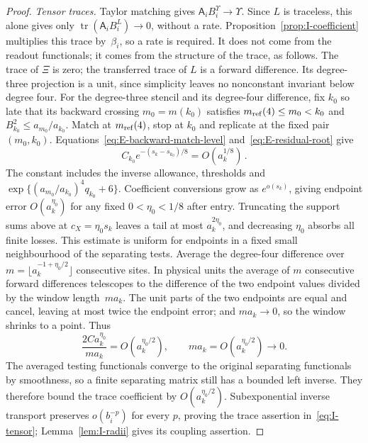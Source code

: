 \begin{proof}
\emph{Tensor traces.} Taylor matching gives $\mathsf A_iB_i^\Upsilon\to\Upsilon$. Since $L$ is traceless, this alone gives only $\operatorname{tr}(\mathsf A_iB_i^L)\to0$, without a rate. Proposition~\ref{prop:I-coefficient} multiplies this trace by~$\beta_i$, so a rate is required. It does not come from the readout functionals; it comes from the structure of the trace, as follows. The trace of $\Xi$ is zero; the transferred trace of $L$ is a forward difference. Its degree-three projection is a unit, since simplicity leaves no nonconstant invariant below degree four. For the degree-three stencil and its degree-four difference, fix $k_0$ so late that its backward crossing $m_0=m(k_0)$ satisfies $m_{\mathrm{ref}}(4)\le m_0<k_0$ and $B_{k_0}^2\le a_{m_0}/a_{k_0}$. Match at $m_{\mathrm{ref}}(4)$, stop at $k_0$ and replicate at the fixed pair $(m_0,k_0)$. Equations~\eqref{eq:E-backward-match-level} and~\eqref{eq:E-residual-root} give
\begin{equation*}
C_{k_0}e^{-(s_k-s_{k_0})/8}=O(a_k^{1/8})\,.
\end{equation*}
The constant includes the inverse allowance, thresholds and $\exp\{(a_{m_0}/a_{k_0})^4q_{k_0}+6\}$. Coefficient conversions grow as $e^{o(s_k)}$, giving endpoint error $O(a_k^{\eta_0})$ for any fixed $0<\eta_0<1/8$ after entry. Truncating the support sums above at $c_X=\eta_0s_k$ leaves a tail at most $a_k^{2\eta_0}$, and decreasing $\eta_0$ absorbs all finite losses. This estimate is uniform for endpoints in a fixed small neighbourhood of the separating tests. Average the degree-four difference over $m=\lfloor a_k^{-1+\eta_0/2}\rfloor$ consecutive sites. In physical units the average of $m$ consecutive forward differences telescopes to the difference of the two endpoint values divided by the window length~$ma_k$. The unit parts of the two endpoints are equal and cancel, leaving at most twice the endpoint error; and $ma_k\to0$, so the window shrinks to a point. Thus
\begin{equation*}
 \frac{2Ca_k^{\eta_0}}{ma_k}=O(a_k^{\eta_0/2}),
 \qquad ma_k=O(a_k^{\eta_0/2})\longrightarrow0.
\end{equation*}
The averaged testing functionals converge to the original separating functionals by smoothness, so a finite separating matrix still has a bounded left inverse. They therefore bound the trace coefficient by $O(a_k^{\eta_0/2})$. Subexponential inverse transport preserves $o(b_i^{-p})$ for every $p$, proving the trace assertion in~\eqref{eq:I-tensor}; Lemma~\ref{lem:I-radii} gives its coupling assertion.
\end{proof}

